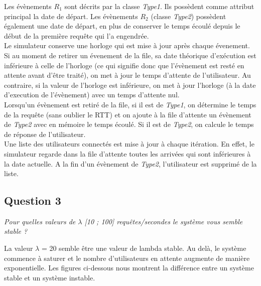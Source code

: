 \documentclass[12pt]{article}
\begin{document}
Les évènements $R_{1}$ sont décrits par la classe \textit{Type1}. Ils possèdent comme attribut principal la date de départ. Les évènements $R_{2}$ (classe \textit{Type2}) possèdent également une date de départ, en plus de conserver le temps écoulé depuis le début de la première requête qui l'a engendrée.\\

Le simulateur conserve une horloge qui est mise à jour après chaque évenement. Si au moment de retirer un évenement de la file, sa date théorique d'exécution est inférieure à celle de l'horloge (ce qui signifie donc que l'évènement est resté en attente avant d'être traité), on met à jour le temps d'attente de l'utilisateur. Au contraire, si la valeur de l'horloge est inférieure, on met à jour l'horloge (à la date d'execution de l'évènement) avec un temps d'attente nul.\\

Lorsqu'un évènement est retiré de la file, si il est de \textit{Type1}, on détermine le temps de la requête (sans oublier le RTT) et on ajoute à la file d'attente un évènement de \textit{Type2} avec en mémoire le temps écoulé. Si il est de \textit{Type2}, on calcule le temps de réponse de l'utilisateur.\\

Une liste des utilisateurs connectés est mise à jour à chaque itération. En effet, le simulateur regarde dans la file d'attente toutes les arrivées qui sont inférieures à la date actuelle. A la fin d'un évènement de \textit{Type2}, l'utilisateur est supprimé de la liste.\\

\subsection{Question 3}
\textit{Pour quelles valeurs de $\lambda$ [10 ; 100] requêtes/secondes le système vous semble stable ? \\} 

La valeur $\lambda$ = 20 semble être une valeur de lambda stable. Au delà, le système commence à saturer et le nombre d'utilisateurs en attente augmente de manière exponentielle. Les figures ci-dessous nous montrent la différence entre un système stable et un système instable.\\
\end{document}

